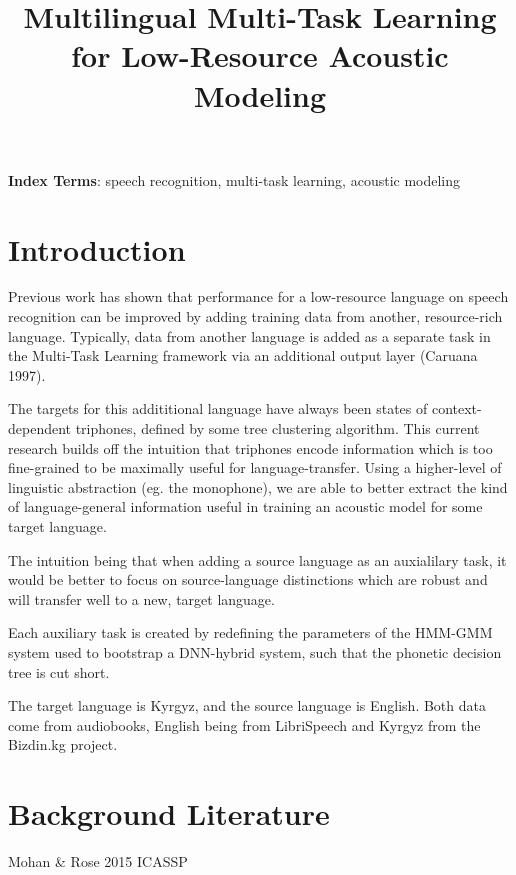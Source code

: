 \documentclass[a4paper]{article}
\title{Multilingual Multi-Task Learning for Low-Resource Acoustic Modeling}
\begin{document}
\maketitle
% 
\begin{abstract}
  
\end{abstract}
\noindent\textbf{Index Terms}: speech recognition, multi-task learning, acoustic modeling

\section{Introduction}

Previous work has shown that performance for a low-resource language on speech recognition can be improved by adding training data from another, resource-rich language. Typically, data from another language is added as a separate task in the Multi-Task Learning framework via an additional output layer (Caruana 1997).

The targets for this addititional language have always been states of context-dependent triphones, defined by some tree clustering algorithm. This current research builds off the intuition that triphones encode information which is too fine-grained to be maximally useful for language-transfer. Using a higher-level of linguistic abstraction (eg. the monophone), we are able to better extract the kind of language-general information useful in training an acoustic model for some target language.

The intuition being that when adding a source language as an auxialilary task, it would be better to focus on source-language distinctions which are robust and will transfer well to a new, target language.

Each auxiliary task is created by redefining the parameters of the HMM-GMM system used to bootstrap a DNN-hybrid system, such that the phonetic decision tree is cut short.

The target language is Kyrgyz, and the source language is English. Both data come from audiobooks, English being from LibriSpeech and Kyrgyz from the Bizdin.kg project.




\section{Background Literature}




Mohan \& Rose 2015 ICASSP
\end{document}
